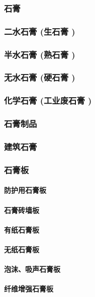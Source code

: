 \documentclass[UTF8]{../../ApplicationUniverse}
\begin{document}
        \subsubsection{石膏}
        \subsubsection{二水石膏 (生石膏 )}
        \subsubsection{半水石膏 (熟石膏 )}
        \subsubsection{无水石膏 (硬石膏 )}
        \subsubsection{化学石膏 (工业废石膏 )}
        \subsubsection{石膏制品}
        \subsubsection{建筑石膏}
        \subsubsection{石膏板}
            \paragraph{防护用石膏板}
            \paragraph{石膏砖墙板}
            \paragraph{有纸石膏板}
            \paragraph{无纸石膏板}
            \paragraph{泡沫、吸声石膏板}
            \paragraph{纤维增强石膏板}
\end{document}
